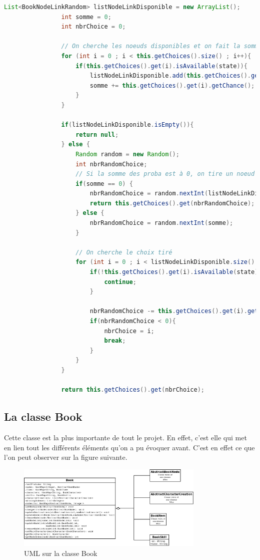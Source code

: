 			\begin{lstlisting}[gobble=16, language=java, label=lst:getRandomChoices, caption=getRandomChoice()]
				List<BookNodeLinkRandom> listNodeLinkDisponible = new ArrayList();
				int somme = 0;
				int nbrChoice = 0;

				// On cherche les noeuds disponibles et on fait la somme des probabilités
				for (int i = 0 ; i < this.getChoices().size() ; i++){
					if(this.getChoices().get(i).isAvailable(state)){
						listNodeLinkDisponible.add(this.getChoices().get(i));
						somme += this.getChoices().get(i).getChance();
					}
				}

				if(listNodeLinkDisponible.isEmpty()){
					return null;
				} else {
					Random random = new Random();
					int nbrRandomChoice;
					// Si la somme des proba est à 0, on tire un noeud au hasard
					if(somme == 0) {
						nbrRandomChoice = random.nextInt(listNodeLinkDisponible.size());
						return this.getChoices().get(nbrRandomChoice);
					} else {
						nbrRandomChoice = random.nextInt(somme);
					}

					// On cherche le choix tiré
					for (int i = 0 ; i < listNodeLinkDisponible.size() ; i++){
						if(!this.getChoices().get(i).isAvailable(state)){
							continue;
						}

						nbrRandomChoice -= this.getChoices().get(i).getChance();
						if(nbrRandomChoice < 0){
							nbrChoice = i;
							break;
						}
					}
				}

				return this.getChoices().get(nbrChoice);
			\end{lstlisting}

		\subsection{La classe Book}
			\label{book}

			Cette classe est la plus importante de tout le projet. En effet, c'est elle qui met en lien tout les différents éléments qu'on a pu évoquer avant. C'est en effet ce que l'on peut observer sur la figure suivante.

			\begin{figure}[H]
				\centering\includegraphics[width=0.8\textwidth, keepaspectratio]{img/book.png}
				\caption{UML sur la classe Book}
			\end{figure}

